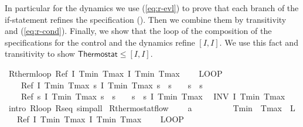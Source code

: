 \documentclass[envcountsame,envcountsect]{llncs}
\begin{document}
\begin{example}
In particular for the dynamics we use (\ref{eq:r-evl}) to prove that each branch of the if-statement refines the specification (). Then we combine them by transitivity and (\ref{eq:r-cond}). Finally, we show that the loop of the composition of the specifications for the control and the dynamics refine $[I,I]$. We use this fact and transitivity to show $\mathsf{Thermostat}\leq [I,I]$.

\begin{isabellebody}
\isanewline
{}\isamarkupfalse%
\ R{\isacharunderscore}therm{\isacharunderscore}loop{\isacharcolon}\ {\isachardoublequoteopen}Ref\ {\isasymlceil}I\ Tmin\ Tmax{\isasymrceil}\ {\isasymlceil}I\ Tmin\ Tmax{\isasymrceil}\ {\isasymge}\ \isanewline
\ \ {\isacharparenleft}LOOP\ \isanewline
\ \ \ \ Ref\ {\isasymlceil}I\ Tmin\ Tmax{\isasymrceil}\ {\isasymlceil}{\isasymlambda}s{\isachardot}\ I\ Tmin\ Tmax\ s\ {\isasymand}\ s{\isachardollar}{}\ {\isacharequal}\ {}\ {\isasymand}\ s{\isachardollar}{}\ {\isacharequal}\ s{\isachardollar}{}{\isasymrceil}{\isacharsemicolon}\isanewline
\ \ \ \ Ref\ {\isasymlceil}{\isasymlambda}s{\isachardot}\ I\ Tmin\ Tmax\ s\ {\isasymand}\ s{\isachardollar}{}\ {\isacharequal}\ {}\ {\isasymand}\ s{\isachardollar}{}\ {\isacharequal}\ s{\isachardollar}{}{\isasymrceil}\ {\isasymlceil}I\ Tmin\ Tmax{\isasymrceil}\isanewline
\ \ INV\ I\ Tmin\ Tmax{\isacharparenright}{\isachardoublequoteclose}\isanewline
{}\isamarkupfalse%
\ {\isacharparenleft}intro\ R{\isacharunderscore}loop\ R{\isacharunderscore}seq{\isacharcomma}\ simp{\isacharunderscore}all{\isacharparenright}%
\isanewline
\isanewline
{}\isamarkupfalse%
\ R{\isacharunderscore}thermostat{\isacharunderscore}flow{\isacharcolon}\ \isanewline
\ \ \ {\isachardoublequoteopen}a\ {\isachargreater}\ {}{\isachardoublequoteclose}\ \ {\isachardoublequoteopen}{}\ {\isasymle}\ {\isasymtau}{\isachardoublequoteclose}\ \ {\isachardoublequoteopen}{}\ {\isacharless}\ Tmin{\isachardoublequoteclose}\ \ {\isachardoublequoteopen}Tmax\ {\isacharless}\ L{\isachardoublequoteclose}\isanewline
\ \ \ {\isachardoublequoteopen}Ref\ {\isasymlceil}I\ Tmin\ Tmax{\isasymrceil}\ {\isasymlceil}I\ Tmin\ Tmax{\isasymrceil}\ {\isasymge}\ \isanewline
\ \ {\isacharparenleft}LOOP\ {\isacharparenleft}\isanewline
\ \ \ \ %

\end{isabellebody}
\end{example}
\end{document}

